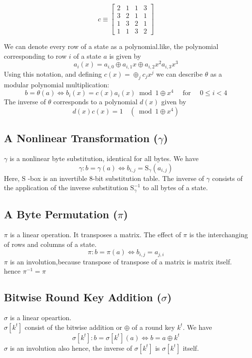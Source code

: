 \documentclass[preprint]{transcrypto}
\begin{document}
\begin{equation*}
  c   \equiv \begin{bmatrix}
    2 & 1 & 1 & 3 \\
    3 & 2 & 1 & 1 \\
    1 & 3 & 2 & 1 \\
    1 & 1 & 3 & 2
  \end{bmatrix}
\end{equation*}

We can denote every row of a state as a polynomial.like, the polynomial corresponding to row $i$ of a state $a$ is given by
$$
  a_{i}(x)=a_{i, 0} \oplus a_{i, 1} x \oplus a_{i, 2} x^{2} a_{i, 3} x^{3}
$$
Using this notation, and defining $c(x)=\oplus_{j} c_{j} x^{j}$ we can describe $\theta$ as a modular polynomial multiplication:
$$
  b=\theta(a) \Leftrightarrow b_{i}(x)=c(x) a_{i}(x) \bmod 1 \oplus x^{4} \quad \text { for } \quad 0 \leq i<4
$$
The inverse of $\theta$ corresponds to a polynomial $d(x)$ given by
$$
  d(x) c(x)=1 \quad\left(\bmod 1 \oplus x^{4}\right)
$$

\subsection{A Nonlinear Transformation ($\gamma$)}

$\gamma$ is a nonlinear byte substitution, identical for all bytes. We have
$$
  \gamma: b=\gamma(a) \Leftrightarrow b_{i, j}=\mathrm{S}_{\gamma}\left(a_{i, j}\right)
$$
Here, $\mathrm{S}$ -box is an invertible 8-bit substitution table.
The inverse of $\gamma$ consists of the application of the inverse substitution $\mathrm{S}_{\gamma}^{-1}$ to all bytes of a state.

\subsection{A Byte Permutation ($\pi$)}
$\pi$ is a linear operation. It transposes a matrix.
The effect of $\pi$ is the interchanging of rows and columns of a state.
$$
  \pi: b=\pi(a) \Leftrightarrow b_{i, j}=a_{j, i}
$$
$\pi$ is an involution,because transpose of transpose of a matrix is matrix itself.\\
hence $\pi^{-1}=\pi$

\subsection{Bitwise Round Key Addition ($\sigma$)}
$\sigma$ is a linear opeartion.\\
$\sigma\left[k^{t}\right]$ consist of the bitwise addition or $\oplus$ of a round key $k^{t} .$ We have
$$
  \sigma\left[k^{t}\right]: b=\sigma\left[k^{t}\right](a) \Leftrightarrow b=a \oplus k^{t}
$$
$\sigma$ is an involution also hence,
the inverse of $\sigma\left[k^{t}\right]$ is $\sigma\left[k^{t}\right]$ itself.
\end{document}
